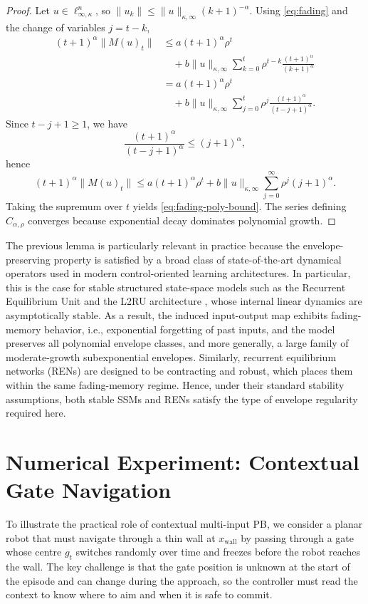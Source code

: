 \documentclass[journal,twoside,web]{ieeecolor}
\begin{document}
\begin{proof}
Let \(u\in\ell_{\infty,\kappa}^n\), so
\(\|u_k\|\le \|u\|_{\kappa,\infty}(k+1)^{-\alpha}\).
Using \eqref{eq:fading} and the change of variables \(j=t-k\),
\begin{align*}
(t+1)^\alpha\|M(u)_t\|
&\le
a(t+1)^\alpha\rho^t \\
&\quad
+b\|u\|_{\kappa,\infty}
\sum_{k=0}^{t}\rho^{t-k}\frac{(t+1)^\alpha}{(k+1)^\alpha} \\
&=
a(t+1)^\alpha\rho^t \\
&\quad
+b\|u\|_{\kappa,\infty}
\sum_{j=0}^{t}\rho^{j}
\frac{(t+1)^\alpha}{(t-j+1)^\alpha}.
\end{align*}
Since \(t-j+1\ge 1\), we have
\[
\frac{(t+1)^\alpha}{(t-j+1)^\alpha}\le (j+1)^\alpha,
\]
hence
\[
(t+1)^\alpha\|M(u)_t\|
\le
a(t+1)^\alpha\rho^t
+
b\|u\|_{\kappa,\infty}
\sum_{j=0}^{\infty}\rho^{j}(j+1)^\alpha.
\]
Taking the supremum over \(t\) yields \eqref{eq:fading-poly-bound}. The series defining
\(C_{\alpha,\rho}\) converges because exponential decay dominates polynomial growth.
\end{proof}

The previous lemma is particularly relevant in practice because the envelope-preserving property is
satisfied by a broad class of state-of-the-art dynamical operators used in modern control-oriented learning architectures.
In particular, this is the case for stable structured state-space models such as the Recurrent Equilibrium Unit \cite{orvieto2023resurrecting} and
the L2RU architecture \cite{11312999}, whose internal linear dynamics are asymptotically stable. As a result, the
induced input-output map exhibits fading-memory behavior, i.e., exponential forgetting of past inputs,
and the model preserves all polynomial envelope classes, and more generally, a large family of
moderate-growth subexponential envelopes. Similarly, recurrent equilibrium networks (RENs) \cite{revay2021recurrent} are designed
to be contracting and robust, which places them within the same fading-memory regime. Hence, under their
standard stability assumptions, both stable SSMs and RENs satisfy the type of envelope regularity
required here.
\section{Numerical Experiment: Contextual Gate Navigation}
\label{sec:exp-gate}

To illustrate the practical role of contextual multi-input PB, we consider a planar robot that must
navigate through a thin wall at \(x_{\mathrm{wall}}\) by passing through a gate whose centre
\(g_t\) switches randomly over time and freezes before the robot reaches the wall.
The key challenge is that the gate position is unknown at the start of the episode and can change
during the approach, so the controller must read the context to know where to aim and when it
is safe to commit.
\end{document}
